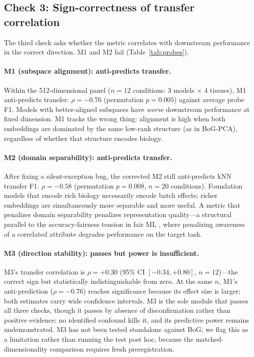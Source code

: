 \documentclass[9pt,lineno]{elife}
\begin{document}
\subsection{Check 3: Sign-correctness of transfer correlation}

The third check asks whether the metric correlates with downstream performance in the correct direction. M1 and M2 fail (Table~\ref{tab:probes}).

\paragraph{M1 (subspace alignment): anti-predicts transfer.} Within the 512-dimensional panel ($n = 12$ conditions: 3 models $\times$ 4 tissues), M1 anti-predicts transfer: $\rho = -0.76$ (permutation $p = 0.005$) against average probe F1. Models with better-aligned subspaces have \emph{worse} downstream performance at fixed dimension. M1 tracks the wrong thing: alignment is high when both embeddings are dominated by the same low-rank structure (as in BoG-PCA), regardless of whether that structure encodes biology.

\paragraph{M2 (domain separability): anti-predicts transfer.} After fixing a silent-exception bug, the corrected M2 still anti-predicts kNN transfer F1: $\rho = -0.58$ (permutation $p = 0.008$, $n = 20$ conditions). Foundation models that encode rich biology necessarily encode batch effects; richer embeddings are simultaneously more separable and more useful. A metric that penalizes domain separability penalizes representation quality---a structural parallel to the accuracy-fairness tension in fair ML \citep{chouldechova2017impossibility}, where penalizing awareness of a correlated attribute degrades performance on the target task.

\paragraph{M3 (direction stability): passes but power is insufficient.} M3's transfer correlation is $\rho = +0.30$ (95\% CI $[-0.34, +0.80]$, $n = 12$)---the correct sign but statistically indistinguishable from zero. At the same $n$, M1's anti-prediction ($\rho = -0.76$) reaches significance because its effect size is larger; both estimates carry wide confidence intervals. M3 is the sole module that passes all three checks, though it passes by absence of disconfirmation rather than positive evidence: no identified confound kills it, and its predictive power remains undemonstrated. M3 has not been tested standalone against BoG; we flag this as a limitation rather than running the test post hoc, because the matched-dimensionality comparison requires fresh preregistration.
\end{document}
